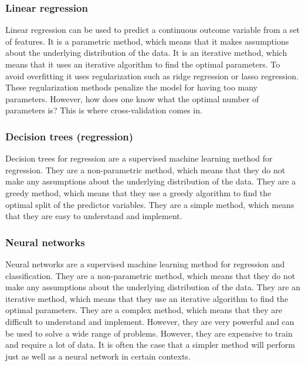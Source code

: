 \documentclass[
  letterpaper,
]{latex/krantz}
\begin{document}
\hypertarget{pda-linear-regression}{%
\subsubsection{Linear regression}\label{pda-linear-regression}}

Linear regression can be used to predict a continuous outcome variable
from a set of features. It is a parametric method, which means that it
makes assumptions about the underlying distribution of the data. It is
an iterative method, which means that it uses an iterative algorithm to
find the optimal parameters. To avoid overfitting it uses regularization
such as ridge regression or lasso regression. These regularization
methods penalize the model for having too many parameters. However, how
does one know what the optimal number of parameters is? This is where
cross-validation comes in.

\hypertarget{pda-decision-trees-regression}{%
\subsubsection{Decision trees
(regression)}\label{pda-decision-trees-regression}}

Decision trees for regression are a supervised machine learning method
for regression. They are a non-parametric method, which means that they
do not make any assumptions about the underlying distribution of the
data. They are a greedy method, which means that they use a greedy
algorithm to find the optimal split of the predictor variables. They are
a simple method, which means that they are easy to understand and
implement.

\hypertarget{pda-neural-networks}{%
\subsubsection{Neural networks}\label{pda-neural-networks}}

Neural networks are a supervised machine learning method for regression
and classification. They are a non-parametric method, which means that
they do not make any assumptions about the underlying distribution of
the data. They are an iterative method, which means that they use an
iterative algorithm to find the optimal parameters. They are a complex
method, which means that they are difficult to understand and implement.
However, they are very powerful and can be used to solve a wide range of
problems. However, they are expensive to train and require a lot of
data. It is often the case that a simpler method will perform just as
well as a neural network in certain contexts.
\end{document}

